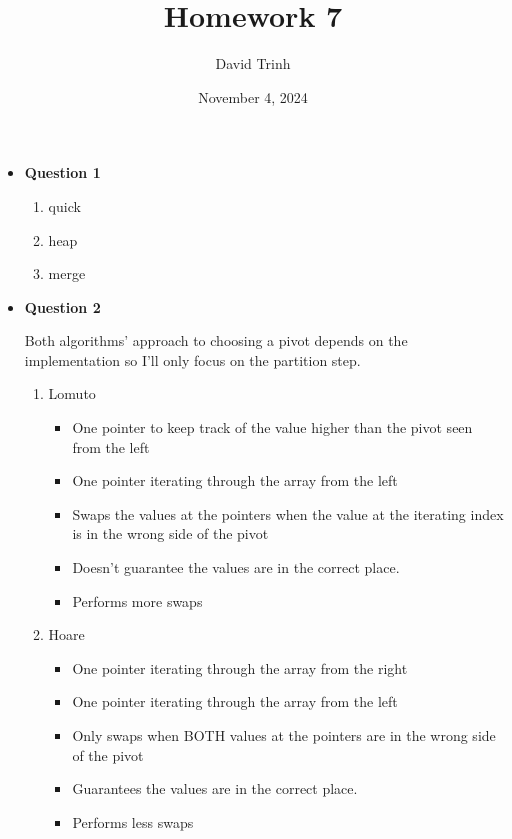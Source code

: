 \documentclass{article}
\title{Homework 7}
\author{David Trinh}
\date{November 4, 2024}
\begin{document}
\maketitle

\begin{itemize}

    \item\textbf{Question 1}

        \begin{enumerate}
            \item quick
            \item heap
            \item merge
        \end{enumerate}

    \item\textbf{Question 2}

        Both algorithms' approach to choosing a pivot depends on the implementation so I'll only focus on the partition step.

        \begin{enumerate}
            \item Lomuto

                \begin{itemize}
                    \item One pointer to keep track of the value higher than the pivot seen from the left
                    \item One pointer iterating through the array from the left
                    \item Swaps the values at the pointers when the value at the iterating index is in the wrong side of the pivot
                    \item Doesn't guarantee the values are in the correct place.
                    \item Performs more swaps
                \end{itemize}

            \item Hoare

                \begin{itemize}
                    \item One pointer iterating through the array from the right
                    \item One pointer iterating through the array from the left
                    \item Only swaps when BOTH values at the pointers are in the wrong side of the pivot
                    \item Guarantees the values are in the correct place.
                    \item Performs less swaps
                \end{itemize}
                

\end{enumerate}
\end{itemize}
\end{document}

